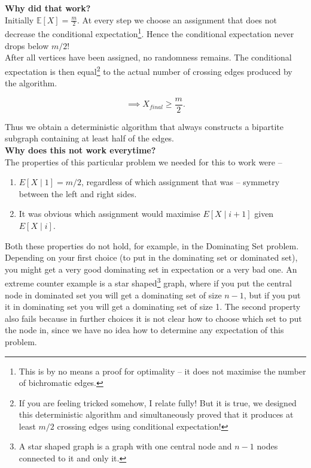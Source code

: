 \documentclass[11pt,openany]{book}
\begin{document}
\vspace{0.5em}

\noindent\textbf{Why did that work?}\\


\noindent Initially $\mathbb E[X]=\frac{m}{2}$. At every step we choose an 
assignment that does not decrease the conditional
expectation\footnote{This is by no means a proof for optimality -- it does not 
maximise the number of bichromatic edges.}. Hence the conditional expectation never drops below \(m/2\)!\\


\noindent After all vertices have been assigned, no randomness remains. The conditional
expectation is then equal\footnote{If you are feeling tricked somehow, 
I relate fully! But it is true, we designed this deterministic algorithm and simultaneously proved that 
it produces at least \(m/2\) crossing edges using conditional expectation!} to the 
actual number of crossing edges produced by the algorithm.

\[
\implies
X_{final} \ge \frac{m}{2}.
\]

\noindent Thus we obtain a deterministic algorithm that always constructs a bipartite
subgraph containing at least half of the edges.\\


\noindent\textbf{Why does this not work everytime?}\\


\noindent The properties of this particular problem we needed for this to work were -- 

\noindent \begin{enumerate}
\item $E[X \mid 1] = m/2$, regardless of which assignment that was -- symmetry between the left and right sides.
\item It was obvious which assignment would maximise $E[X \mid i+1]$ given $E[X \mid i]$.
\end{enumerate}

\noindent Both these properties do not hold, for example, in the Dominating Set problem. Depending 
on your first choice (to put in the dominating set or dominated set), you might get a 
very good dominating set in expectation or a very bad one. An extreme counter example is a star shaped\footnote{A star shaped graph is a graph with 
one central node and \(n-1\) nodes connected to it and only it.} 
graph, where if you put the central node in dominated set you will get a dominating set of size \(n-1\), 
but if you put it in dominating set you will get a dominating set of size 1. 
The second property also fails because in further choices it is not 
clear how to choose which set to put the node in, since we have no idea how to 
determine any expectation of this problem.
\end{document}
